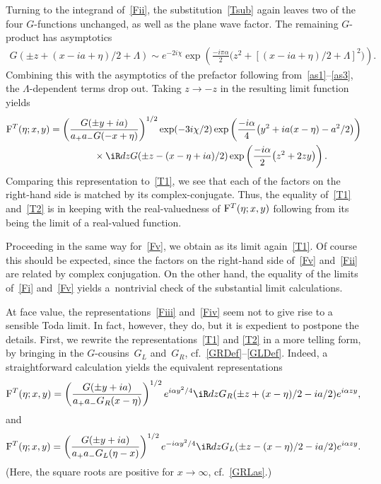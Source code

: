 \documentclass[pdftex]{sigma}
\numberwithin{equation}{section}
\begin{document}
Turning to the integrand of~\eqref{Fii}, the substitution~\eqref{Tsub} again leaves two of the four $G$-functions unchanged, as well as the plane wave factor. The remaining $G$-product has asymptotics
\begin{gather}
G(\pm z +(x-ia+\eta)/2+\Lambda)\sim e^{-2i\chi}\exp\left(\frac{-i\pi\alpha}{2}\big(z^2+[(x-ia+\eta)/2+\Lambda]^2\big)\right).
\end{gather}
Combining this with the asymptotics of the prefactor following from~\eqref{as1}--\eqref{as3}, the $\Lambda$-dependent terms drop out. Taking $z\to -z$ in the resulting limit function yields
\begin{gather}
{\rm F}^T(\eta;x,y)  =   \left(\frac{G(\pm y+ia)}{a_{+}a_-G(-x+\eta)}\right)^{1/2} \exp(-3i\chi/2)\exp\left( \frac{-i\alpha}{4}\big(y^2+ia(x-\eta)-a^2/2\big)\right)
\nonumber \\
\phantom{{\rm F}^T(\eta;x,y)  =}{}  \times \iR dz G(\pm z -(x-\eta+ia)/2)
 \exp\left( \frac{-i\alpha}{2}\big(z^2+2zy\big)\right).\label{T2}
 \end{gather}
Comparing this representation to~\eqref{T1}, we see that each of the factors on the right-hand side is matched by its complex-conjugate. Thus, the equality of~\eqref{T1} and~\eqref{T2} is in keeping with the real-valuedness of ${\rm F}^T(\eta;x,y)$ following from its being the limit of a real-valued function.

Proceeding in the same way for~\eqref{Fv}, we obtain as its limit again~\eqref{T1}. Of course this should be expected, since the factors on the right-hand side of~\eqref{Fv} and~\eqref{Fii} are related by complex conjugation. On the other hand, the equality of the limits of~\eqref{Fi} and~\eqref{Fv} yields a~nontrivial check of the substantial limit calculations.

At face value, the representations~\eqref{Fiii} and~\eqref{Fiv} seem not to give rise to a sensible Toda limit. In fact, however, they do, but it is expedient to postpone the details. First, we rewrite the representations~\eqref{T1} and \eqref{T2} in a more telling form, by bringing in the $G$-cousins~$G_L$ and~$G_R$, cf.~\eqref{GRDef}--\eqref{GLDef}. Indeed, a straightforward calculation yields the equivalent representations
\begin{gather}\label{T1eq}
{\rm F}^T(\eta;x,y) = \left(\frac{G(\pm y+ia)}{a_{+}a_-G_R(x-\eta)}\right)^{1/2}e^{i\alpha y^2/4}\iR dz G_R(\pm z +(x-\eta)/2-ia/2)
 e^{i\alpha zy},
 \end{gather}
and
\begin{gather}\label{T2eq}
{\rm F}^T(\eta;x,y) =  \left(\frac{G(\pm y+ia)}{a_+a_-G_L(\eta-x)}\right)^{1/2}e^{-i\alpha y^2/4}
\iR dz G_L(\pm z -(x-\eta)/2-ia/2)
 e^{i\alpha zy}.
 \end{gather}
 (Here, the square roots are positive for $x\to\infty$, cf.~\eqref{GRLas}.)
\end{document}

